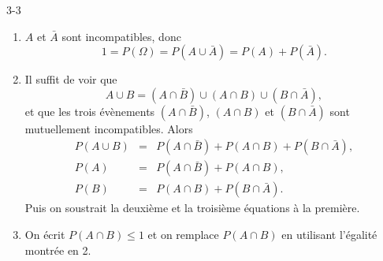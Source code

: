 \begin{corrige}{3-3}

\begin{enumerate}
 \item $A$ et $\bar{A}$ sont incompatibles, donc 
 \[
  1 = P(\Omega) = P(A \cup \bar{A}) = P(A) + P(\bar{A}).
 \]

 \item Il suffit de voir que
 \[
  A \cup B = (A\cap\bar{B}) \cup (A\cap B) \cup (B\cap\bar{A}),
 \]
 et que les trois évènements $(A\cap\bar{B})$, $(A\cap B)$ et $(B\cap\bar{A})$ sont mutuellement incompatibles. Alors
 \begin{eqnarray*}
  P(A \cup B) & = & P(A\cap\bar{B}) + P(A\cap B) + P(B\cap\bar{A}),\\
  P(A) & = & P(A\cap\bar{B}) + P(A\cap B),\\
  P(B) & = & P(A\cap B) + P(B\cap\bar{A}).
 \end{eqnarray*}
  Puis on soustrait la deuxième et la troisième équations à la première.
 
 \item On écrit $P(A\cap B) \leq 1$ et on remplace $P(A\cap B)$ en utilisant l'égalité montrée en 2.
 
\end{enumerate}


\end{corrige}

